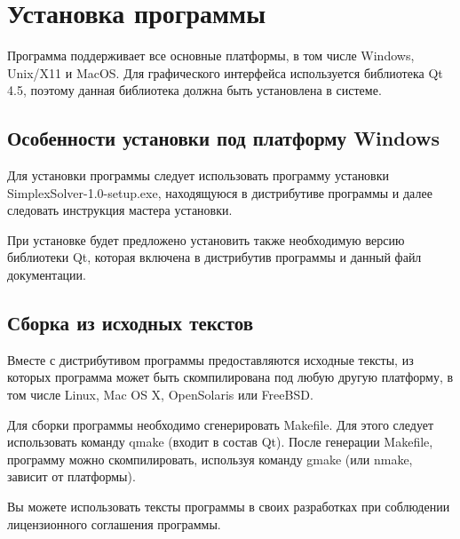 \chapter{Установка программы}
Программа поддерживает все основные платформы, в том числе Windows, Unix/X11 и MacOS. Для графического интерфейса используется библиотека Qt 4.5, поэтому данная библиотека должна быть установлена в системе.

\section{Особенности установки под платформу Windows}
Для установки программы следует использовать программу установки SimplexSolver-1.0-setup.exe, находящуюся в дистрибутиве программы и далее следовать инструкция мастера установки.

При установке будет предложено установить также необходимую версию библиотеки Qt, которая включена в дистрибутив программы и данный файл документации.

\section{Сборка из исходных текстов}
Вместе с дистрибутивом программы предоставляются исходные тексты, из которых программа может быть скомпилирована под любую другую платформу, в том числе Linux, Mac OS X, OpenSolaris или FreeBSD.

Для сборки программы необходимо сгенерировать Makefile. Для этого следует использовать команду qmake (входит в состав Qt). После генерации Makefile, программу можно скомпилировать, используя команду gmake (или nmake, зависит от платформы).

Вы можете использовать тексты программы в своих разработках при соблюдении лицензионного соглашения программы.
